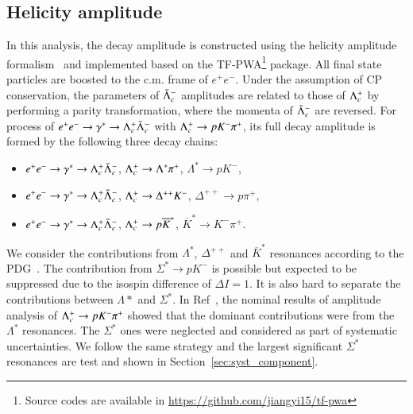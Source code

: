 \subsection{Helicity amplitude}
\label{sec:helicity_amplitude}
In this analysis, the decay amplitude is constructed using the helicity amplitude formalism~\cite{Chung:186421,Richman:153636} and implemented based on the TF-PWA\footnote[1]{Source codes are available in \hyperlink{github}{https://github.com/jiangyi15/tf-pwa}} package. All final state particles are boosted to the c.m. frame of $e^+e^-$. Under the assumption of CP conservation, the parameters of $\bar{\Lambda}_{c}^{-}$ amplitudes are related to those of $\Lambda_{c}^{+}$ by performing a parity transformation, where the momenta of $\bar{\Lambda}_{c}^{-}$ are reversed. 
For process of $e^+e^- \rightarrow \gamma^* \rightarrow \Lambda_{c}^{+}\bar{\Lambda}_{c}^{-}$ with $\Lambda_{c}^{+} \rightarrow pK^-\pi^+$, its full decay amplitude is formed by the following three decay chains:
\begin{itemize}
    \item $e^+e^- \rightarrow \gamma^* \rightarrow \Lambda_{c}^{+}\bar{\Lambda}_{c}^{-}$, $\Lambda_{c}^{+} \rightarrow \Lambda^*\pi^+$, $\Lambda^* \to pK^-$, 
    \item $e^+e^- \rightarrow \gamma^* \rightarrow \Lambda_{c}^{+}\bar{\Lambda}_{c}^{-}$, $\Lambda_{c}^{+} \rightarrow \Delta^{++}K^-$, $\Delta^{++} \to p\pi^+$,
    \item $e^+e^- \rightarrow \gamma^* \rightarrow \Lambda_{c}^{+}\bar{\Lambda}_{c}^{-}$, $\Lambda_{c}^{+} \rightarrow p\overline{K}^*$, $\overline{K}^* \to K^-\pi^+$.
\end{itemize}
We consider the contributions from $\Lambda^*$, $\Delta^{++}$ and $\overline{K}^*$ resonances according to the PDG~\cite{Workman:2022ynf}. The contribution from $\Sigma^*\to pK^-$ is possible but expected to be suppressed due to the isospin difference of $\Delta I = 1$. It is also hard to separate the contributions between $\Lambda*$ and $\Sigma^*$. In Ref~\cite{LHCb:2022ouv}, the nominal results of amplitude analysis of $\Lambda_{c}^{+} \rightarrow p K^-\pi^+$ showed that the dominant contributions were from the $\Lambda^*$ resonances. The $\Sigma^*$ ones were neglected and considered as part of systematic uncertainties. We follow the same strategy and the largest significant $\Sigma^*$ resonances are test and shown in Section~\ref{sec:syst_component}.

